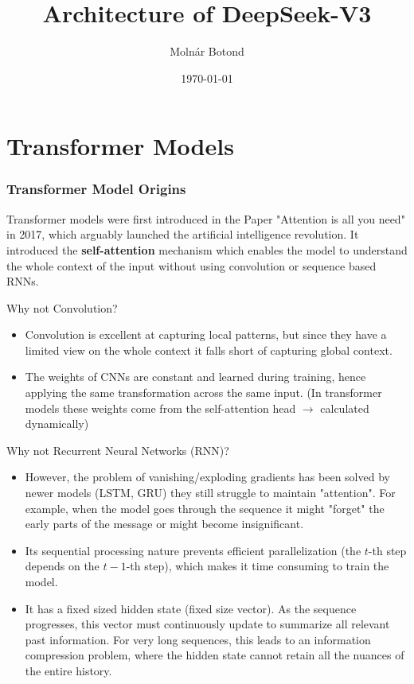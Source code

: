 \documentclass{beamer}
\title{Architecture of DeepSeek-V3}
\author{Molnár Botond}
\date{\today}
\begin{document}
\begin{frame}[noframenumbering]
    \titlepage
\end{frame}

\section{Transformer Models}

\begin{frame}
    \frametitle{Transformer Model Origins}
    Transformer models were first introduced in the Paper "Attention is all you need" in 2017, which arguably launched the artificial intelligence revolution. 
    It introduced the \textbf{self-attention} mechanism which enables the model to understand the whole context of the input without using convolution or sequence based RNNs. \cite{vaswani2017attention}
\end{frame}

\begin{frame}{Why not Convolution?}
    \begin{itemize}
        \item Convolution is excellent at capturing local patterns, but since they have a limited view on the whole context it falls short of capturing global context. \cite{CNNfield}
        \item The weights of CNNs are constant and learned during training, hence applying the same transformation across the same input. (In transformer models these weights come from the self-attention head $\rightarrow$ calculated dynamically)
    \end{itemize}
\end{frame}




\begin{frame}{Why not Recurrent Neural Networks (RNN)?}
    \begin{itemize}
        \item However, the problem of vanishing/exploding gradients has been solved by newer models (LSTM, GRU) they still struggle to maintain "attention". For example, when the model goes through the sequence it might "forget" the early parts of the message or might become insignificant. \cite{heycoachRNN}
        \item Its sequential processing nature prevents efficient parallelization (the $t$-th step depends on the $t-1$-th step), which makes it  time consuming to train the model. \cite{eitcaRNNchallenges}
        \item It has a  fixed sized hidden state (fixed size vector). As the sequence progresses, this vector must continuously update to summarize all relevant past information. For very long sequences, this leads to an information compression problem, where the hidden state cannot retain all the nuances of the entire history. \cite{ibmRNN}
    \end{itemize}
\end{frame}
\end{document}
